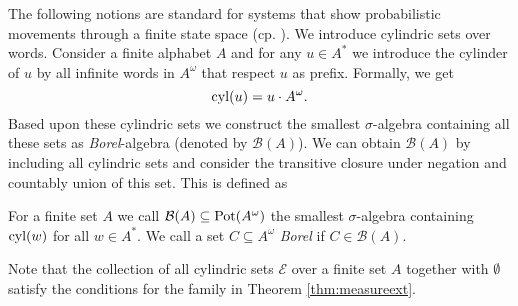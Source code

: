 The following notions are standard for systems that show probabilistic
movements through a finite state space (cp.
\cite{RandomnessForFree,AlgorithmsForPOSG}). We introduce cylindric sets over
words. Consider a finite alphabet $A$ and for any $u\in A^{*}$ we introduce the 
cylinder of $u$ by all infinite words in $A^{\omega}$ that respect $u$ as
prefix. Formally, we get
\begin{equation*}
  \operatorname{cyl}(u) = u\cdot A^{\omega}.
\end{equation*}
Based upon these cylindric sets we construct the smallest $\sigma$-algebra
containing all these sets  as \emph{Borel}-algebra (denoted by 
$\mathcal{B}(A)$). We can obtain $\mathcal{B}(A)$ by including all cylindric 
sets and consider the transitive closure under negation and countably union of 
this set. This is defined as
\begin{definition}
  For a finite set $A$ we call $\mathcal{B}(A)\subseteq\operatorname{Pot}(A^{\omega})$ the 
  smallest $\sigma$-algebra containing $\operatorname{cyl}(w)$ for all $w\in A^{*}$. We call
  a set $C\subseteq A^{\omega}$ \emph{Borel} if $C\in\mathcal{B}(A)$.
  \label{def:borelalgebra}
\end{definition}
Note that the collection of all cylindric sets $\mathcal{E}$ over a finite set
$A$ together with $\emptyset$ satisfy the conditions for the family in Theorem
\ref{thm:measureext}.


